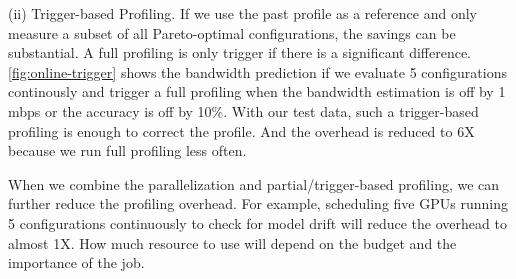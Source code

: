 (ii) Trigger-based Profiling. If we use the past profile as a reference and only
measure a subset of all Pareto-optimal configurations, the savings can be
substantial. A full profiling is only trigger if there is a significant
difference. \autoref{fig:online-trigger} shows the bandwidth prediction if we
evaluate 5 configurations continously and trigger a full profiling when the
bandwidth estimation is off by 1 mbps or the accuracy is off by 10\%. With our
test data, such a trigger-based profiling is enough to correct the profile.  And
the overhead is reduced to 6X because we run full profiling less often.

When we combine the parallelization and partial/trigger-based profiling, we can
further reduce the profiling overhead. For example, scheduling five GPUs running
5 configurations continuously to check for model drift will reduce the overhead
to almost 1X. How much resource to use will depend on the budget and the
importance of the job.


